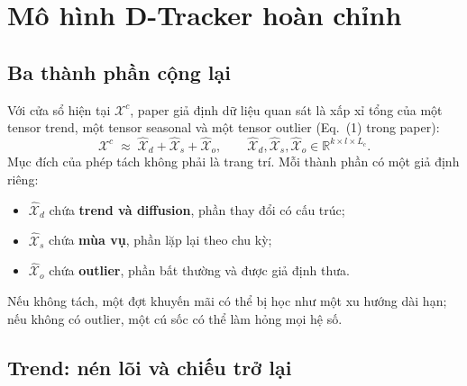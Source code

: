 \section{Mô hình D-Tracker hoàn chỉnh}
\label{sec:model}

\subsection{Ba thành phần cộng lại}

Với cửa sổ hiện tại $\mathcal{X}^{c}$, paper giả định dữ liệu quan sát là xấp xỉ tổng của một
tensor trend, một tensor seasonal và một tensor outlier (Eq.~(1) trong paper):
\begin{equation}
  \mathcal{X}^{c}\;\approx\;\widehat{\mathcal{X}}_d
  +\widehat{\mathcal{X}}_s+\widehat{\mathcal{X}}_o,
  \qquad
  \widehat{\mathcal{X}}_d,\widehat{\mathcal{X}}_s,\widehat{\mathcal{X}}_o
  \in\mathbb{R}^{k\times l\times L_c}.
  \label{eq:model-sum}
\end{equation}
Mục đích của phép tách không phải là trang trí. Mỗi thành phần có một giả định riêng:
\begin{itemize}
  \item $\widehat{\mathcal{X}}_d$ chứa \textbf{trend và diffusion}, phần thay đổi có cấu trúc;
  \item $\widehat{\mathcal{X}}_s$ chứa \textbf{mùa vụ}, phần lặp lại theo chu kỳ;
  \item $\widehat{\mathcal{X}}_o$ chứa \textbf{outlier}, phần bất thường và được giả định thưa.
\end{itemize}
Nếu không tách, một đợt khuyến mãi có thể bị học như một xu hướng dài hạn; nếu không có outlier,
một cú sốc có thể làm hỏng mọi hệ số.

\subsection{Trend: nén lõi và chiếu trở lại}


